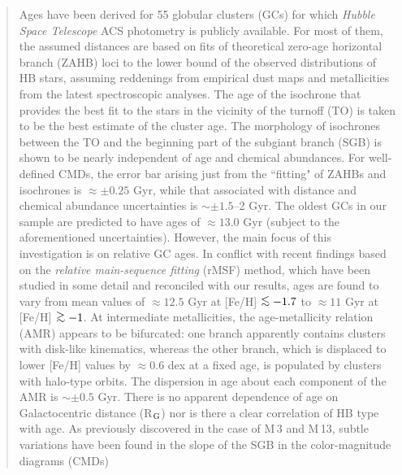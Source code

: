 \documentclass[12pt,preprint]{aastex}
\newcommand\lta{\mathrel{\hbox{\raise 0.6 ex \hbox{$<$}\kern
                   -1.8 ex\lower .5 ex\hbox{$\sim$}}}}
\newcommand\gta{\mathrel{\hbox{\raise 0.6 ex \hbox{$>$}\kern
                   -1.7 ex\lower .5 ex\hbox{$\sim$}}}}
\begin{document}
\begin{abstract}
Ages have been derived for 55 globular clusters (GCs) for which {\it Hubble
Space Telescope} ACS photometry is publicly available.  For most of them, the
assumed distances are based on fits of theoretical zero-age horizontal branch
(ZAHB) loci to the lower bound
of the observed distributions of HB stars, assuming reddenings from empirical
dust maps and metallicities from the latest spectroscopic analyses.  The age of
the isochrone that provides the best fit to the stars in the vicinity of the
turnoff (TO) is taken to be the best estimate of the cluster age.  The
morphology of isochrones between the TO and the beginning part of the subgiant
branch (SGB) is shown to be nearly independent of age and chemical abundances.
For well-defined CMDs, the error bar arising just from the ``fitting" of ZAHBs
and isochrones is $\approx \pm 0.25$ Gyr, while that associated with distance
and chemical abundance uncertainties is $\sim \pm 1.5$--2 Gyr.  The oldest GCs
in our sample are predicted to have ages of $\approx 13.0$ Gyr (subject to the
aforementioned uncertainties).  However, the main focus of this investigation
is on relative GC ages.  In conflict with recent findings based on the
{\it relative main-sequence fitting} (rMSF) method, which have been studied
in some detail and reconciled with our results, ages are found to vary from
mean values of $\approx 12.5$ Gyr at [Fe/H] $\lta -1.7$ to $\approx 11$ Gyr at
[Fe/H] $\gta -1$.  At intermediate metallicities, the age-metallicity relation
(AMR) appears to be bifurcated: one branch apparently contains clusters with
disk-like kinematics, whereas the other branch, which is displaced to lower
[Fe/H] values by $\approx 0.6$ dex at a fixed age, is populated by clusters
with halo-type orbits.  The dispersion in age about each component of the AMR
is $\sim \pm 0.5$ Gyr.  There is no apparent dependence of age on Galactocentric
distance (R$_{\rm G}$) nor is there a clear correlation of HB type with age.
As previously discovered in the case of M$\,$3 and M$\,$13, subtle variations
have been found in the slope of the SGB in the color-magnitude diagrams (CMDs)

\end{abstract}
\end{document}
